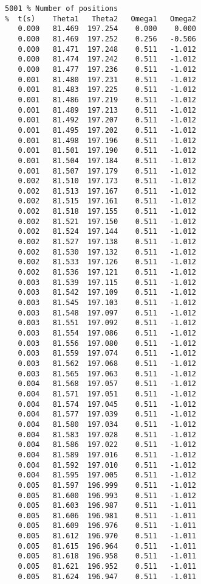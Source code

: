 \begin{verbatim}
5001 % Number of positions
%  t(s)    Theta1   Theta2   Omega1   Omega2
   0.000   81.469  197.254    0.000    0.000
   0.000   81.469  197.252    0.256   -0.506
   0.000   81.471  197.248    0.511   -1.012
   0.000   81.474  197.242    0.511   -1.012
   0.000   81.477  197.236    0.511   -1.012
   0.001   81.480  197.231    0.511   -1.012
   0.001   81.483  197.225    0.511   -1.012
   0.001   81.486  197.219    0.511   -1.012
   0.001   81.489  197.213    0.511   -1.012
   0.001   81.492  197.207    0.511   -1.012
   0.001   81.495  197.202    0.511   -1.012
   0.001   81.498  197.196    0.511   -1.012
   0.001   81.501  197.190    0.511   -1.012
   0.001   81.504  197.184    0.511   -1.012
   0.001   81.507  197.179    0.511   -1.012
   0.002   81.510  197.173    0.511   -1.012
   0.002   81.513  197.167    0.511   -1.012
   0.002   81.515  197.161    0.511   -1.012
   0.002   81.518  197.155    0.511   -1.012
   0.002   81.521  197.150    0.511   -1.012
   0.002   81.524  197.144    0.511   -1.012
   0.002   81.527  197.138    0.511   -1.012
   0.002   81.530  197.132    0.511   -1.012
   0.002   81.533  197.126    0.511   -1.012
   0.002   81.536  197.121    0.511   -1.012
   0.003   81.539  197.115    0.511   -1.012
   0.003   81.542  197.109    0.511   -1.012
   0.003   81.545  197.103    0.511   -1.012
   0.003   81.548  197.097    0.511   -1.012
   0.003   81.551  197.092    0.511   -1.012
   0.003   81.554  197.086    0.511   -1.012
   0.003   81.556  197.080    0.511   -1.012
   0.003   81.559  197.074    0.511   -1.012
   0.003   81.562  197.068    0.511   -1.012
   0.003   81.565  197.063    0.511   -1.012
   0.004   81.568  197.057    0.511   -1.012
   0.004   81.571  197.051    0.511   -1.012
   0.004   81.574  197.045    0.511   -1.012
   0.004   81.577  197.039    0.511   -1.012
   0.004   81.580  197.034    0.511   -1.012
   0.004   81.583  197.028    0.511   -1.012
   0.004   81.586  197.022    0.511   -1.012
   0.004   81.589  197.016    0.511   -1.012
   0.004   81.592  197.010    0.511   -1.012
   0.004   81.595  197.005    0.511   -1.012
   0.005   81.597  196.999    0.511   -1.012
   0.005   81.600  196.993    0.511   -1.012
   0.005   81.603  196.987    0.511   -1.011
   0.005   81.606  196.981    0.511   -1.011
   0.005   81.609  196.976    0.511   -1.011
   0.005   81.612  196.970    0.511   -1.011
   0.005   81.615  196.964    0.511   -1.011
   0.005   81.618  196.958    0.511   -1.011
   0.005   81.621  196.952    0.511   -1.011
   0.005   81.624  196.947    0.511   -1.011

\end{verbatim}
